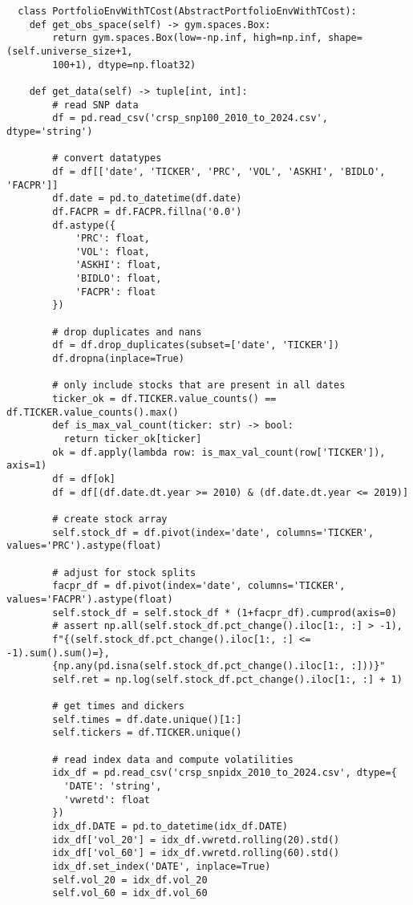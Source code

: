 \begin{verbatim}
  class PortfolioEnvWithTCost(AbstractPortfolioEnvWithTCost):
    def get_obs_space(self) -> gym.spaces.Box:
        return gym.spaces.Box(low=-np.inf, high=np.inf, shape=(self.universe_size+1, 
        100+1), dtype=np.float32)

    def get_data(self) -> tuple[int, int]:
        # read SNP data
        df = pd.read_csv('crsp_snp100_2010_to_2024.csv', dtype='string')
    
        # convert datatypes
        df = df[['date', 'TICKER', 'PRC', 'VOL', 'ASKHI', 'BIDLO', 'FACPR']]
        df.date = pd.to_datetime(df.date)
        df.FACPR = df.FACPR.fillna('0.0')
        df.astype({
            'PRC': float,
            'VOL': float,
            'ASKHI': float,
            'BIDLO': float,
            'FACPR': float
        })
    
        # drop duplicates and nans
        df = df.drop_duplicates(subset=['date', 'TICKER'])
        df.dropna(inplace=True)
    
        # only include stocks that are present in all dates
        ticker_ok = df.TICKER.value_counts() == df.TICKER.value_counts().max()
        def is_max_val_count(ticker: str) -> bool:
          return ticker_ok[ticker]
        ok = df.apply(lambda row: is_max_val_count(row['TICKER']), axis=1)
        df = df[ok]
        df = df[(df.date.dt.year >= 2010) & (df.date.dt.year <= 2019)]
    
        # create stock array
        self.stock_df = df.pivot(index='date', columns='TICKER', values='PRC').astype(float)
        
        # adjust for stock splits
        facpr_df = df.pivot(index='date', columns='TICKER', values='FACPR').astype(float)
        self.stock_df = self.stock_df * (1+facpr_df).cumprod(axis=0)
        # assert np.all(self.stock_df.pct_change().iloc[1:, :] > -1), 
        f"{(self.stock_df.pct_change().iloc[1:, :] <= -1).sum().sum()=}, 
        {np.any(pd.isna(self.stock_df.pct_change().iloc[1:, :]))}"
        self.ret = np.log(self.stock_df.pct_change().iloc[1:, :] + 1)
    
        # get times and dickers
        self.times = df.date.unique()[1:]
        self.tickers = df.TICKER.unique()
    
        # read index data and compute volatilities
        idx_df = pd.read_csv('crsp_snpidx_2010_to_2024.csv', dtype={
          'DATE': 'string',
          'vwretd': float
        })
        idx_df.DATE = pd.to_datetime(idx_df.DATE)
        idx_df['vol_20'] = idx_df.vwretd.rolling(20).std()
        idx_df['vol_60'] = idx_df.vwretd.rolling(60).std()
        idx_df.set_index('DATE', inplace=True)
        self.vol_20 = idx_df.vol_20
        self.vol_60 = idx_df.vol_60
    

\end{verbatim}
